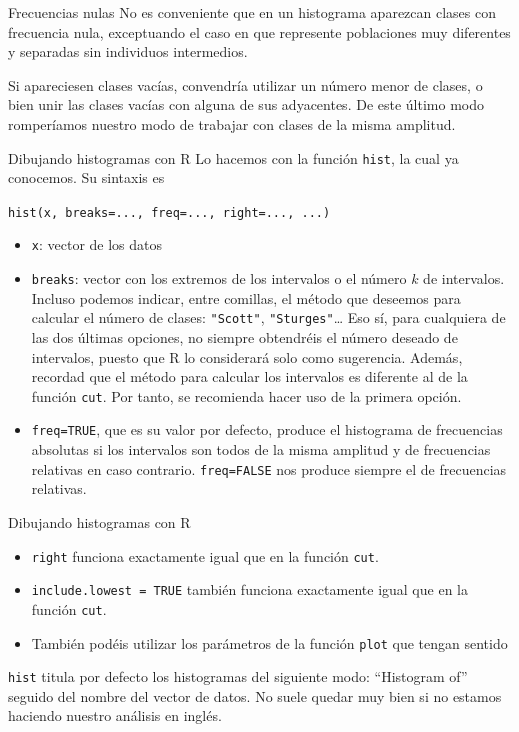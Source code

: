 \documentclass[
  ignorenonframetext,
]{beamer}
\providecommand{\tightlist}{%
  \setlength{\itemsep}{0pt}\setlength{\parskip}{0pt}}
\begin{document}
\begin{frame}{Frecuencias nulas}
\label{frecuencias-nulas}
No es conveniente que en un histograma aparezcan clases con frecuencia
nula, exceptuando el caso en que represente poblaciones muy diferentes y
separadas sin individuos intermedios.

Si apareciesen clases vacías, convendría utilizar un número menor de
clases, o bien unir las clases vacías con alguna de sus adyacentes. De
este último modo romperíamos nuestro modo de trabajar con clases de la
misma amplitud.
\end{frame}

\begin{frame}[fragile]{Dibujando histogramas con R}
\label{dibujando-histogramas-con-r}
Lo hacemos con la función \texttt{hist}, la cual ya conocemos. Su
sintaxis es

\texttt{hist(x,\ breaks=...,\ freq=...,\ right=...,\ ...)}

\begin{itemize}
\tightlist
\item
  \texttt{x}: vector de los datos
\item
  \texttt{breaks}: vector con los extremos de los intervalos o el número
  \(k\) de intervalos. Incluso podemos indicar, entre comillas, el
  método que deseemos para calcular el número de clases:
  \texttt{"Scott"}, \texttt{"Sturges"}\ldots{} Eso sí, para cualquiera
  de las dos últimas opciones, no siempre obtendréis el número deseado
  de intervalos, puesto que R lo considerará solo como sugerencia.
  Además, recordad que el método para calcular los intervalos es
  diferente al de la función \texttt{cut}. Por tanto, se recomienda
  hacer uso de la primera opción.
\item
  \texttt{freq=TRUE}, que es su valor por defecto, produce el histograma
  de frecuencias absolutas si los intervalos son todos de la misma
  amplitud y de frecuencias relativas en caso contrario.
  \texttt{freq=FALSE} nos produce siempre el de frecuencias relativas.
\end{itemize}
\end{frame}

\begin{frame}[fragile]{Dibujando histogramas con R}
\label{dibujando-histogramas-con-r-1}
\begin{itemize}
\tightlist
\item
  \texttt{right} funciona exactamente igual que en la función
  \texttt{cut}.
\item
  \texttt{include.lowest\ =\ TRUE} también funciona exactamente igual
  que en la función \texttt{cut}.
\item
  También podéis utilizar los parámetros de la función \texttt{plot} que
  tengan sentido
\end{itemize}

\texttt{hist} titula por defecto los histogramas del siguiente modo:
``Histogram of'' seguido del nombre del vector de datos. No suele quedar
muy bien si no estamos haciendo nuestro análisis en inglés.
\end{frame}
\end{document}
